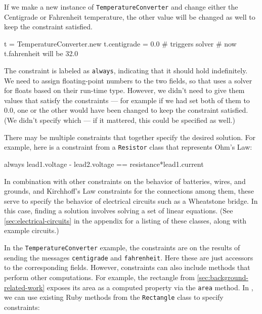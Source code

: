 If we make a new instance of \lstinline{TemperatureConverter} and
change either the Centigrade or Fahrenheit temperature, the other
value will be changed as well to keep the constraint satisfied.

\begin{code}
t = TemperatureConverter.new
t.centigrade = 0.0 # triggers solver
# now t.fahrenheit will be 32.0
\end{code}

The constraint is labeled as \lstinline{always}, indicating that it
should hold indefinitely.  We need to assign floating-point numbers to
the two fields, so that \toolname uses a solver for floats based on
their run-time type. However, we didn't need to give them values that
satisfy the constraints --- for example if we had set both of them to
0.0, one or the other would have been changed to keep the constraint
satisfied.  (We didn't specify which --- if it mattered, this could be
specified as well.)

There may be multiple constraints that together specify the desired
solution.  For example, here is a constraint from a
\lstinline{Resistor} class that represents Ohm's Law:

\begin{code}
  always { lead1.voltage - lead2.voltage == resistance*lead1.current }
\end{code}

In combination with other constraints on the behavior of
batteries, wires, and grounds, and Kirchhoff's Law constraints for the
connections among them, these serve to specify the behavior of
electrical circuits such as a Wheatstone bridge.  In this case,
finding a solution involves solving a set of linear equations.  (See
\autoref{sec:electrical-circuits} in the appendix
for a listing of these classes, along with example circuits.)


In the \lstinline{TemperatureConverter} example, the constraints are
on the results of sending the messages \lstinline{centigrade} and
\lstinline{fahrenheit}.  Here these are just accessors to the corresponding
fields.  However, constraints can also include methods that perform other
computations. For example, the rectangle from
\autoref{sec:background-related-work} exposes its area as a computed
property via the \lstinline{area} method. In \toolname, we can use
existing Ruby methods from the \lstinline{Rectangle} class to specify
constraints:

